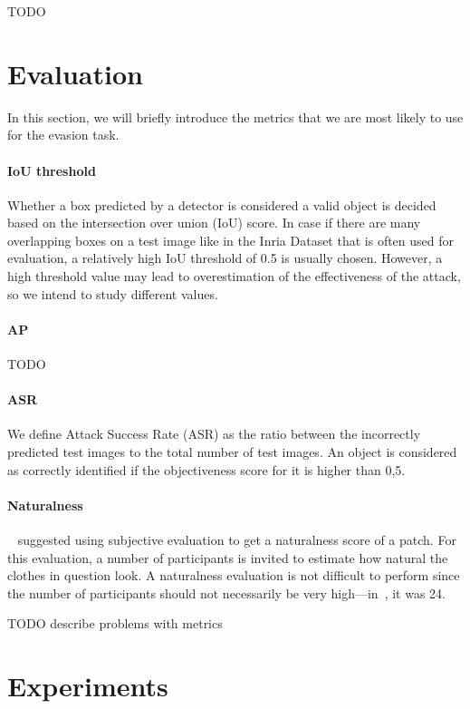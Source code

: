TODO

\section{Evaluation}

In this section, we will briefly introduce the metrics that we are most likely to use for the evasion task.

\paragraph{IoU threshold}
Whether a box predicted by a detector is considered a valid object is decided based on the intersection over union (IoU) score.
In case if there are many overlapping boxes on a test image like in the Inria Dataset that is often used for evaluation, a relatively high IoU threshold of 0.5 is usually chosen.
However, a high threshold value may lead to overestimation of the effectiveness of the attack, so we intend to study different values.

\paragraph{AP} 
TODO 

\paragraph{ASR}
We define Attack Success Rate (ASR) as the ratio between the incorrectly predicted test images to the total number of test images.
An object is considered as correctly identified if the objectiveness score for it is higher than 0,5.

\paragraph{Naturalness}
~\cite{dog_patch_clothes} suggested using subjective evaluation to get a naturalness score of a patch.
For this evaluation, a number of participants is invited to estimate how natural the clothes in question look.
A naturalness evaluation is not difficult to perform since the number of participants should not necessarily be very high---in~\cite{dog_patch_clothes}, it was 24.

TODO describe problems with metrics

\section{Experiments}


